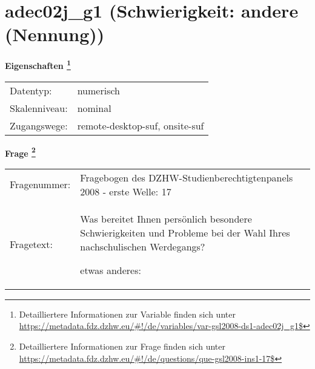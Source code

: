
    \setcounter{footnote}{0}

    \vspace*{-1.8cm}
	\section{adec02j\_g1 (Schwierigkeit: andere (Nennung))}
	\label{section:adec02j_g1}



    \vspace*{0.5cm}
    \noindent\textbf{Eigenschaften
	\footnote{Detailliertere Informationen zur Variable finden sich unter
		\url{https://metadata.fdz.dzhw.eu/\#!/de/variables/var-gsl2008-ds1-adec02j_g1$}}}\\
	\begin{tabularx}{\hsize}{@{}lX}
	Datentyp: & numerisch \\
	Skalenniveau: & nominal \\
	Zugangswege: &
	  remote-desktop-suf, 
	  onsite-suf
 \\
    \end{tabularx}



				\vspace*{0.5cm}
                \noindent\textbf{Frage
	                \footnote{Detailliertere Informationen zur Frage finden sich unter
		              \url{https://metadata.fdz.dzhw.eu/\#!/de/questions/que-gsl2008-ins1-17$}}}\\
				\begin{tabularx}{\hsize}{@{}lX}
					Fragenummer: &
					  Fragebogen des DZHW-Studienberechtigtenpanels 2008 - erste Welle:
					  17
 \\
					Fragetext: & Was bereitet Ihnen persönlich besondere Schwierigkeiten und Probleme bei der Wahl Ihres nachschulischen Werdegangs?\par  etwas anderes: \\
				\end{tabularx}





